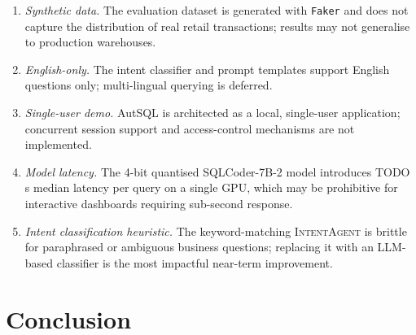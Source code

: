 \documentclass[conference]{IEEEtran}
\begin{document}
\begin{enumerate}
  \item \emph{Synthetic data.} The evaluation dataset is generated
    with \texttt{Faker} and does not capture the distribution of
    real retail transactions; results may not generalise to
    production warehouses.
  \item \emph{English-only.} The intent classifier and prompt templates
    support English questions only; multi-lingual querying is deferred.
  \item \emph{Single-user demo.} AutSQL is architected as a local,
    single-user application; concurrent session support and
    access-control mechanisms are not implemented.
  \item \emph{Model latency.} The 4-bit quantised SQLCoder-7B-2 model
    introduces TODO\,s median latency per query on a single GPU,
    which may be prohibitive for interactive dashboards requiring
    sub-second response.
  \item \emph{Intent classification heuristic.} The keyword-matching
    \textsc{IntentAgent} is brittle for paraphrased or ambiguous
    business questions; replacing it with an LLM-based classifier
    is the most impactful near-term improvement.
\end{enumerate}


\section{Conclusion}
\label{sec:conclusion}

\end{document}
